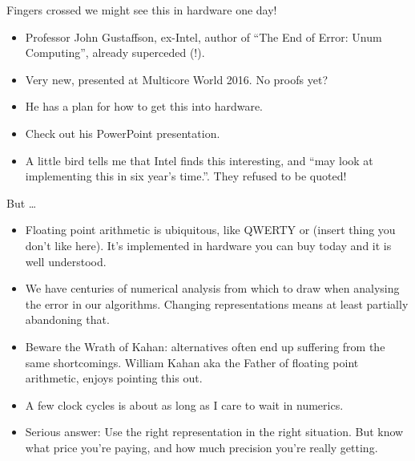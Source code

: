 \documentclass{beamer}
\begin{document}
\begin{frame}{Fingers crossed we might see this in hardware one day!}
\begin{itemize}
\item Professor John Gustaffson, ex-Intel, author of ``The End of Error: Unum Computing'',
			already superceded (!).
\item Very new, presented at Multicore World 2016. No proofs yet?
\item He has a plan for how to get this into hardware.
\item Check out his PowerPoint presentation.
\item A little bird tells me that Intel finds this interesting, and ``may look at implementing this in
			six year's time.''. They refused to be quoted!
\end{itemize}
\end{frame}


\begin{frame}{But \ldots}
\begin{itemize}
\item Floating point arithmetic is ubiquitous, like QWERTY or (insert thing
			you don't like here). It's implemented in hardware you can buy today and it is well understood.
\item We have centuries of numerical analysis from which to draw when analysing the error in our algorithms.
			Changing representations means at least partially abandoning that.
\item Beware the Wrath of Kahan: alternatives often end up suffering from the same shortcomings. 
			William Kahan aka the Father of floating point arithmetic, enjoys pointing this out.
\item A few clock cycles is about as long as I care to wait in numerics.
\item Serious answer: Use the right representation in the right situation. But know what price you're 
			paying, and how much precision you're really getting.
\end{itemize}
\end{frame}
\end{document}
